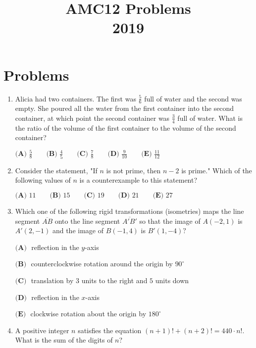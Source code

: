 \documentclass{article}
\title{AMC12 Problems \\ 2019}
\date{}
\begin{document}
\maketitle\thispagestyle{fancy}\newpage\section*{Problems}\begin{enumerate}[label=\arabic*., itemsep=0.5em]\item Alicia had two containers. The first was $\tfrac{5}{6}$ full of water and the second was empty. She poured all the water from the first container into the second container, at which point the second container was $\tfrac{3}{4}$ full of water. What is the ratio of the volume of the first container to the volume of the second container?

$\textbf{(A) } \frac{5}{8} \qquad \textbf{(B) } \frac{4}{5} \qquad \textbf{(C) } \frac{7}{8} \qquad \textbf{(D) } \frac{9}{10} \qquad \textbf{(E) } \frac{11}{12}$\par \vspace{0.5em}\item Consider the statement, "If $n$ is not prime, then $n-2$ is prime." Which of the following values of $n$ is a counterexample to this statement?

$\textbf{(A) } 11 \qquad \textbf{(B) } 15 \qquad \textbf{(C) } 19 \qquad \textbf{(D) } 21 \qquad \textbf{(E) } 27$\par \vspace{0.5em}\item Which one of the following rigid transformations (isometries) maps the line segment $\overline{AB}$ onto the line segment $\overline{A'B'}$ so that the image of $A(-2,1)$ is $A'(2,-1)$ and the image of $B(-1,4)$ is $B'(1,-4)?$

$\textbf{(A) } $ reflection in the $y$-axis

$\textbf{(B) } $ counterclockwise rotation around the origin by $90^{\circ}$

$\textbf{(C) } $ translation by $3$ units to the right and $5$ units down

$\textbf{(D) } $ reflection in the $x$-axis

$\textbf{(E) } $ clockwise rotation about the origin by $180^{\circ}$\par \vspace{0.5em}\item A positive integer $n$ satisfies the equation $(n+1)!+(n+2)!=440\cdot n!$. What is the sum of the digits of $n$?


\end{enumerate}
\end{document}
